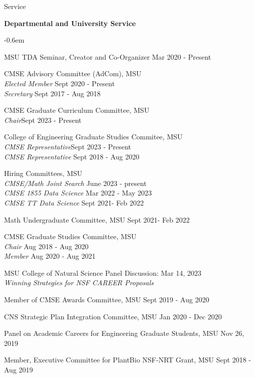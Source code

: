 \documentclass{resume} %
\begin{document}
%
\newpage
\begin{rSection}{Service}



\textbf{Departmental and University Service}
\begin{list}{}{\leftmargin=1em}
   \itemsep -0.6em \vspace{-0.5em} %

\item
MSU TDA Seminar, Creator and Co-Organizer  \hfill Mar 2020 - Present

\item
CMSE Advisory Committee (AdCom), MSU\\
\phantom{xxx} \textit{Elected Member} \hfill Sept 2020 - Present\\
\phantom{xxx} \textit{Secretary} \hfill  Sept 2017 - Aug 2018
\item CMSE Graduate Curriculum Committee, MSU\\ 
\phantom{xxx} \textit{Chair}\hfill Sept 2023 - Present 
\item
College of Engineering Graduate Studies Commitee, MSU \\
   \phantom{xxx} \textit{CMSE Representative}\hfill Sept 2023 - Present\\ 
   \phantom{xxx} \textit{CMSE Representative} \hfill Sept 2018 - Aug 2020

\item Hiring Committees, MSU \\
\phantom{xxx} \textit{CMSE/Math Joint Search} \hfill June 2023 - present\\
\phantom{xxx} \textit{CMSE 1855 Data Science } \hfill Mar 2022 - May 2023\\
\phantom{xxx} \textit{CMSE TT Data Science} \hfill  Sept 2021- Feb 2022
\item Math Undergraduate Committee, MSU  \hfill  Sept 2021- Feb 2022

\item
CMSE Graduate Studies Committee, MSU\\
\phantom{xxx} \textit{Chair} \hfill  Aug 2018 - Aug 2020\\
\phantom{xxx} \textit{Member} \hfill  Aug 2020 - Aug 2021
\item MSU College of Natural Science Panel Discussion: \hfill Mar 14, 2023\\
\phantom{xxx}\textit{ Winning Strategies for NSF CAREER Proposals}
\item
Member of CMSE Awards Committee, MSU \hfill Sept 2019 - Aug 2020
\item
CNS Strategic Plan Integration Committee, MSU \hfill Jan 2020 - Dec 2020
\item
Panel on Academic Careers for Engineering Graduate Students, MSU \hfill Nov 26, 2019
\item Member, Executive Committee for PlantBio NSF-NRT Grant, MSU
\hfill Sept 2018 - Aug 2019


\end{list}
\end{rSection}
\end{document}
